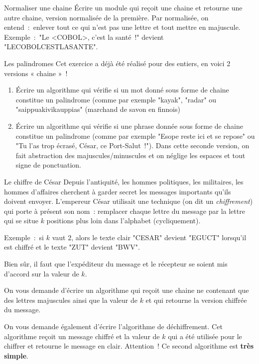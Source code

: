 \begin{Exercice}{Normaliser une chaine}
	Écrire un module qui reçoit une chaine et retourne une autre chaine,
	version normalisée de la première.
	Par normalisée, on entend~:~enlever tout ce qui n’est pas une lettre 
	et tout mettre en majuscule.
	\\Exemple~:~"Le <COBOL>, c’est la santé~!" devient "LECOBOLCESTLASANTE".
\end{Exercice}

\begin{Exercice}{Les palindromes}
	Cet exercice a déjà été réalisé pour des entiers, 
	en voici 2 versions « chaine »~! 
	\begin{enumerate}[label=\alph*)]
		\item 
			Écrire un algorithme qui vérifie 
			si un mot donné sous forme de chaine 
			constitue un palindrome 
			(comme par exemple "kayak", "radar" ou "saippuakivikauppias" 
			(marchand de savon en finnois)
		\item
			Écrire un algorithme qui vérifie 
			si une phrase donnée sous forme de chaine constitue un palindrome 
			(comme par exemple "Esope reste ici et se repose" 
			ou "Tu l’as trop écrasé, César, ce Port-Salut~!"). 
			Dans cette seconde version, 
			on fait abstraction des majuscules/minuscules 
			et on néglige les espaces et tout signe de ponctuation.
	\end{enumerate}
\end{Exercice}

\begin{Exercice}{Le chiffre de César}
	\label{ex:cesar}
	Depuis l’antiquité, les hommes politiques, les militaires, 
	les hommes d’affaires cherchent à garder secret les messages
	importants qu’ils doivent envoyer.
	L’empereur César utilisait une technique (on dit un \emph{chiffrement})
	qui porte à présent son nom~:
	remplacer chaque lettre du message par la lettre qui se situe 
	$k$ positions plus loin dans l’alphabet (cycliquement).

	Exemple~:~si $k$ vaut $2$, 
	alors le texte clair "CESAR" devient "EGUCT" lorsqu’il est chiffré 
	et le texte "ZUT" devient "BWV".

	Bien sûr, il faut que l’expéditeur du message et le récepteur
	se soient mis d’accord sur la valeur de $k$.

	On vous demande d’écrire un algorithme qui reçoit une chaine ne contenant
	que des lettres majuscules ainsi que la valeur de $k$ et qui retourne
	la version chiffrée du message.

	On vous demande également d’écrire l’algorithme de déchiffrement.
	Cet algorithme reçoit un message chiffré et la valeur de $k$ qui a été
	utilisée pour le chiffrer et retourne le message en clair.
	Attention~! Ce second algorithme est \textbf{très simple}.
\end{Exercice}

